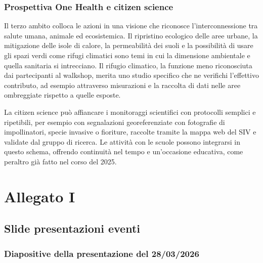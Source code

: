 \documentclass[
  a4paper,
]{book}
\begin{document}
\subsection{Prospettiva One Health e citizen science}\label{prospettiva-one-health-e-citizen-science}

Il terzo ambito colloca le azioni in una visione che riconosce l'interconnessione tra salute umana, animale ed ecosistemica. Il ripristino ecologico delle aree urbane, la mitigazione delle isole di calore, la permeabilità dei suoli e la possibilità di usare gli spazi verdi come rifugi climatici sono temi in cui la dimensione ambientale e quella sanitaria si intrecciano. Il rifugio climatico, la funzione meno riconosciuta dai partecipanti al walkshop, merita uno studio specifico che ne verifichi l'effettivo contributo, ad esempio attraverso misurazioni e la raccolta di dati nelle aree ombreggiate rispetto a quelle esposte.

La citizen science può affiancare i monitoraggi scientifici con protocolli semplici e ripetibili, per esempio con segnalazioni georeferenziate con fotografie di impollinatori, specie invasive o fioriture, raccolte tramite la mappa web del SIV e validate dal gruppo di ricerca. Le attività con le scuole possono integrarsi in questo schema, offrendo continuità nel tempo e un'occasione educativa, come peraltro già fatto nel corso del 2025.

\chapter{Allegato I}\label{annexI}

\section{Slide presentazioni eventi}\label{slide-presentazioni-eventi}

\subsection{Diapositive della presentazione del 28/03/2026}\label{diapositive-della-presentazione-del-28032026}
\end{document}
